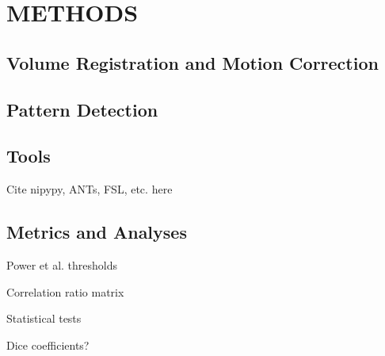 \chapter{METHODS}
\label{ch:methods}

\section{Volume Registration and Motion Correction}

\section{Pattern Detection}

\section{Tools}

Cite nipypy, ANTs, FSL, etc. here

\section{Metrics and Analyses}

Power et al. thresholds

Correlation ratio matrix

Statistical tests

Dice coefficients?